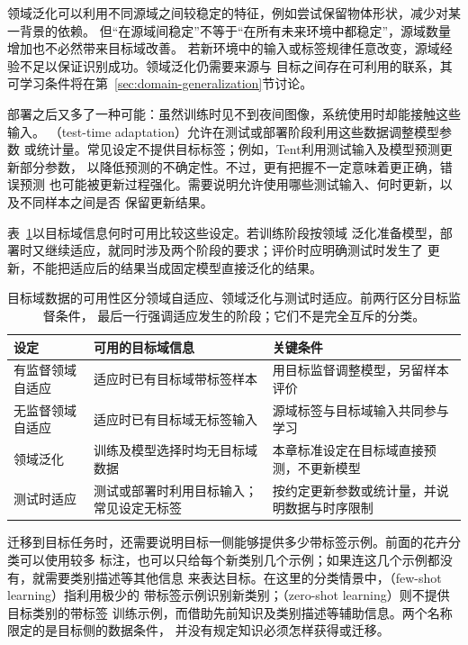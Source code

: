 领域泛化可以利用不同源域之间较稳定的特征，例如尝试保留物体形状，减少对某一背景的依赖。
但“在源域间稳定”不等于“在所有未来环境中都稳定”，源域数量增加也不必然带来目标域改善。
若新环境中的输入或标签规律任意改变，源域经验不足以保证识别成功。领域泛化仍需要来源与
目标之间存在可利用的联系，其可学习条件将在第~\ref{sec:domain-generalization}节讨论。

部署之后又多了一种可能：虽然训练时见不到夜间图像，系统使用时却能接触这些输入。
（test-time adaptation）允许在测试或部署阶段利用这些数据调整模型参数
或统计量。常见设定不提供目标标签；例如，Tent利用测试输入及模型预测更新部分参数，
以降低预测的不确定性。不过，更有把握不一定意味着更正确，错误预测
也可能被更新过程强化。需要说明允许使用哪些测试输入、何时更新，以及不同样本之间是否
保留更新结果。

表~\ref{tab:domain-transfer-settings}以目标域信息何时可用比较这些设定。若训练阶段按领域
泛化准备模型，部署时又继续适应，就同时涉及两个阶段的要求；评价时应明确测试时发生了
更新，不能把适应后的结果当成固定模型直接泛化的结果。

\begin{table}[htbp]
  \centering
  \small
  \begin{tabularx}{\linewidth}{@{}lXX@{}}
    \toprule
    \textbf{设定} & \textbf{可用的目标域信息} & \textbf{关键条件} \\
    \midrule
    有监督领域自适应 & 适应时已有目标域带标签样本 & 用目标监督调整模型，另留样本评价 \\
    无监督领域自适应 & 适应时已有目标域无标签输入 & 源域标签与目标域输入共同参与学习 \\
    领域泛化 & 训练及模型选择时均无目标域数据 & 本章标准设定在目标域直接预测，不更新模型 \\
    测试时适应 & 测试或部署时利用目标输入；常见设定无标签 & 按约定更新参数或统计量，并说明数据与时序限制 \\
    \bottomrule
  \end{tabularx}
  \caption{目标域数据的可用性区分领域自适应、领域泛化与测试时适应。前两行区分目标监督条件，
  最后一行强调适应发生的阶段；它们不是完全互斥的分类。}
  \label{tab:domain-transfer-settings}
\end{table}
\FloatBarrier

迁移到目标任务时，还需要说明目标一侧能够提供多少带标签示例。前面的花卉分类可以使用较多
标注，也可以只给每个新类别几个示例；如果连这几个示例都没有，就需要类别描述等其他信息
来表达目标。在这里的分类情景中，（few-shot learning）指利用极少的
带标签示例识别新类别；（zero-shot learning）则不提供目标类别的带标签
训练示例，而借助先前知识及类别描述等辅助信息。两个名称限定的是目标侧的数据条件，
并没有规定知识必须怎样获得或迁移。

